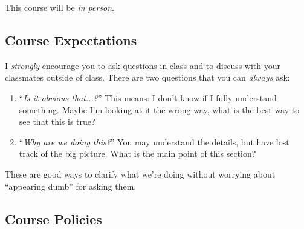 \documentclass[12pt]{article}
\numberwithin{equation}{section}    %
\begin{document}
This course will be \emph{in person}. 

\subsection{Course Expectations}

I \emph{strongly} encourage you to ask questions in class and to discuss with your classmates outside of class. There are two questions that you can \emph{always} ask:
\begin{enumerate}
	\item ``\emph{Is it obvious that...?}'' This means: I don't know if I fully understand something. Maybe I'm looking at it the wrong way, what is the best way to see that this is true? 
	\item ``\emph{Why are we doing this?}'' You may understand the details, but have lost track of the big picture. What is the main point of this section?
\end{enumerate}
These are good ways to clarify what we're doing without worrying about ``appearing dumb'' for asking them.

\subsection{Course Policies}
\end{document}
